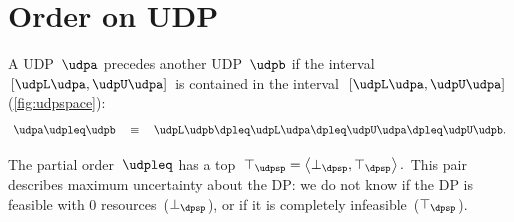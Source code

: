 \section{Order on UDP}
\begin{definition}
A UDP~$\udpa$ precedes another UDP~$\udpb$ if the interval~$[\udpL\udpa,\udpU\udpa]$
is contained in the interval~$[\udpL\udpa,\udpU\udpa]$ (\cref{fig:udpspace}):
\[
\udpa\udpleq\udpb\quad\equiv\quad\udpL\udpb\dpleq\udpL\udpa\dpleq\udpU\udpa\dpleq\udpU\udpb.
\]
\end{definition}

The partial order~$\udpleq$ has a top~$\top_{\udpsp}=\left\langle \bot_{\dpsp},\top_{\dpsp}\right\rangle .$
This pair describes maximum uncertainty about the DP: we do not know
if the DP is feasible with 0 resources~($\bot_{\dpsp}$), or if it
is completely infeasible~($\top_{\dpsp}$).

